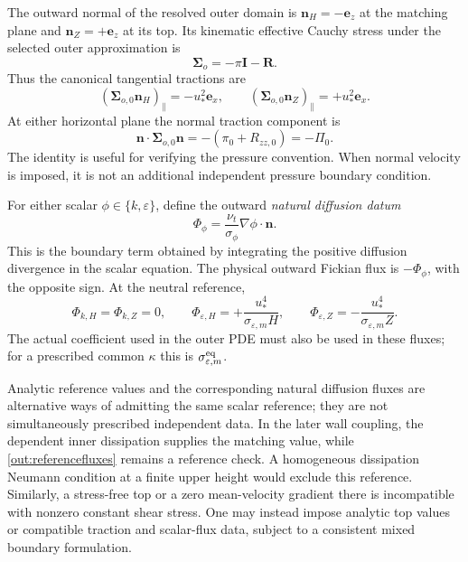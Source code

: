 \documentclass[11pt,a4paper]{article}
\numberwithin{equation}{section}
\newcommand{\eps}{\varepsilon}
\newcommand{\ust}{u_*}
\newcommand{\nut}{\nu_t}
\newcommand{\Id}{\boldsymbol I}
\newcommand{\R}{\boldsymbol R}
\begin{document}
The outward normal of the resolved outer domain is
$\boldsymbol n_H=-\boldsymbol e_z$ at the matching plane and
$\boldsymbol n_Z=+\boldsymbol e_z$ at its top. Its kinematic effective
Cauchy stress under the selected outer approximation is
\begin{equation}
 \boldsymbol\Sigma_o=-\pi\Id-\R.
 \label{out:outerCauchy}
\end{equation}
Thus the canonical tangential tractions are
\begin{equation}
 (\boldsymbol\Sigma_{o,0}\boldsymbol n_H)_\parallel
   =-\ust^2\boldsymbol e_x,\qquad
 (\boldsymbol\Sigma_{o,0}\boldsymbol n_Z)_\parallel
   =+\ust^2\boldsymbol e_x.
 \label{out:boundarytractions}
\end{equation}
At either horizontal plane the normal traction component is
\begin{equation}
 \boldsymbol n\cdot\boldsymbol\Sigma_{o,0}\boldsymbol n
 =-(\pi_0+R_{zz,0})=-\Pi_0.
 \label{out:normaltraction}
\end{equation}
The identity is useful for verifying the pressure convention. When
normal velocity is imposed, it is not an additional independent
pressure boundary condition.

For either scalar $\phi\in\{k,\eps\}$, define the outward
\emph{natural diffusion datum}
\begin{equation}
 \Phi_\phi=\frac{\nut}{\sigma_\phi}\nabla\phi\cdot\boldsymbol n.
 \label{out:fluxdefinition}
\end{equation}
This is the boundary term obtained by integrating the positive
diffusion divergence in the scalar equation. The physical outward
Fickian flux is $-\Phi_\phi$, with the opposite sign. At the neutral
reference,
\begin{equation}
 \Phi_{k,H}=\Phi_{k,Z}=0,\qquad
 \boxed{\Phi_{\eps,H}=+\frac{\ust^4}{\sigma_{\eps,m}H},\qquad
        \Phi_{\eps,Z}=-\frac{\ust^4}{\sigma_{\eps,m}Z}.}
 \label{out:referencefluxes}
\end{equation}
The actual coefficient used in the outer PDE must also be used in these
fluxes; for a prescribed common $\kappa$ this is
$\sigma_{\eps,m}^{\rm eq}$.

Analytic reference values and the corresponding natural diffusion
fluxes are alternative ways of admitting the same scalar reference;
they are not simultaneously prescribed independent data. In the later
wall coupling, the dependent inner dissipation supplies the matching
value, while \cref{out:referencefluxes} remains a reference check.
A homogeneous dissipation Neumann condition at a finite upper height
would exclude this reference. Similarly, a stress-free top or a zero
mean-velocity gradient there is incompatible with nonzero constant
shear stress. One may instead impose analytic top values or compatible
traction and scalar-flux data, subject to a consistent mixed boundary
formulation.
\end{document}
